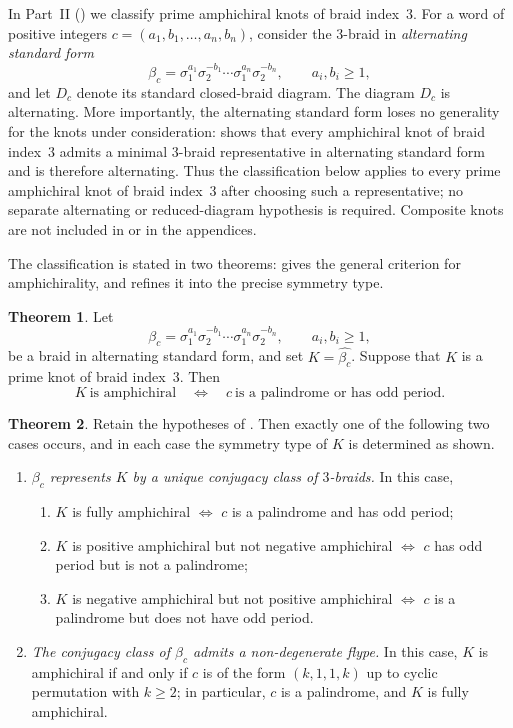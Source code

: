 \documentclass[11pt]{article}
\theoremstyle{definition}
\newtheorem{maintheorem}{Theorem}
\begin{document}
In Part~II () we classify prime amphichiral knots of braid
index~$3$. For a word of positive integers
$c=(a_1,b_1,\ldots,a_n,b_n)$, consider the $3$-braid in
\emph{alternating standard form}
\[
  \beta_c
  = \sigma_1^{a_1}\sigma_2^{-b_1}\cdots\sigma_1^{a_n}\sigma_2^{-b_n},
  \qquad a_i, b_i \ge 1,
\]
and let $D_c$ denote its standard closed-braid diagram. The diagram $D_c$ is
alternating. More importantly, the alternating standard form loses no
generality for the knots under consideration:
 shows that every amphichiral knot of braid
index~$3$ admits a minimal $3$-braid representative in alternating standard
form and is therefore alternating. Thus the classification below applies to
every prime amphichiral knot of braid index~$3$ after choosing such a
representative; no separate alternating or reduced-diagram hypothesis is
required. Composite knots are not included in  or in the
appendices.

The classification is stated in two theorems:  gives the general
criterion for amphichirality, and  refines it into the precise symmetry
type.

\begin{maintheorem}\label{thm:B}
Let \[\beta_c=\sigma_{1}^{a_1}\sigma_{2}^{-b_1}\cdots
\sigma_{1}^{a_n}\sigma_{2}^{-b_n},
\qquad a_i,b_i\ge1,
\]
be a braid in alternating standard form, and set $K=\widehat{\beta_c}$. Suppose that $K$ is a prime knot of braid index~$3$. Then 
\[
K\ \text{is amphichiral}
\quad\Longleftrightarrow\quad
c\ \text{is a palindrome or has odd period.}
\]
\end{maintheorem}

\begin{maintheorem}\label{thm:C}
Retain the hypotheses of . Then exactly one of the following two cases
occurs, and in each case the symmetry type of $K$ is determined as shown.
\begin{enumerate}[label=\textup{(\Alph*)}]
\item \emph{$\beta_c$ represents $K$ by a unique conjugacy class of $3$-braids.}
In this case,
  \begin{enumerate}[label=\textup{(\roman*)}]
  \item $K$ is fully amphichiral $\iff$ $c$ is a palindrome and has odd period;
  \item $K$ is positive amphichiral but not negative amphichiral $\iff$ $c$ has odd period but is not a palindrome;
  \item $K$ is negative amphichiral but not positive amphichiral $\iff$ $c$ is a palindrome but does not have odd period.
  \end{enumerate}
\item \emph{The conjugacy class of $\beta_c$ admits a non-degenerate flype.} In this
case, $K$ is amphichiral if and only if $c$ is of the form $(k,1,1,k)$ up to cyclic
permutation with $k\ge 2$; in particular, $c$ is a palindrome, and $K$ is fully
amphichiral.
\end{enumerate}
\end{maintheorem}
\end{document}
